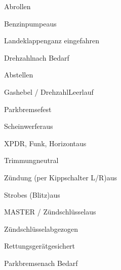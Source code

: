 \begin{checklist}{Abrollen}
	\item{Benzinpumpe}{aus}
	\item{Landeklappen}{ganz eingefahren}
	\item{Drehzahl}{nach Bedarf}
\end{checklist}

\begin{checklist}{Abstellen}
	  \item{Gashebel / Drehzahl}{Leerlauf}
	  \item{Parkbremse}{fest}
	  \item{Scheinwerfer}{aus}
	  \item{XPDR, Funk, Horizont}{aus}
	  \item{Trimmung}{neutral}
	  \item{Zündung (per Kippschalter L/R)}{aus}
	  
	  \item{Strobes (Blitz)}{aus}
	  \item{MASTER / Zündschlüssel}{aus}
	  \item{Zündschlüssel}{abgezogen}
	  \item{Rettungsgerät}{gesichert}
	  
	  \item{Parkbremse}{nach Bedarf}
\end{checklist}

